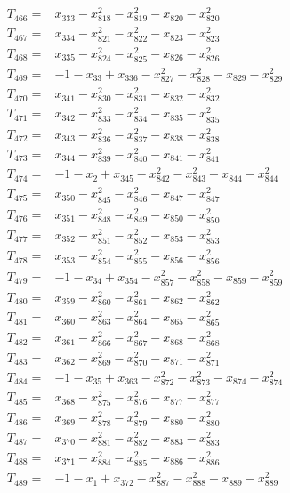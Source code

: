 \begin{align*}
T_{466}={}&x_{333}-x_{818}^{2}-x_{819}^{2}-x_{820}-x_{820}^{2}\\[3pt]
T_{467}={}&x_{334}-x_{821}^{2}-x_{822}^{2}-x_{823}-x_{823}^{2}\\[3pt]
T_{468}={}&x_{335}-x_{824}^{2}-x_{825}^{2}-x_{826}-x_{826}^{2}\\[3pt]
T_{469}={}&-1-x_{33}+x_{336}-x_{827}^{2}-x_{828}^{2}-x_{829}-x_{829}^{2}\\[3pt]
T_{470}={}&x_{341}-x_{830}^{2}-x_{831}^{2}-x_{832}-x_{832}^{2}\\[3pt]
T_{471}={}&x_{342}-x_{833}^{2}-x_{834}^{2}-x_{835}-x_{835}^{2}\\[3pt]
T_{472}={}&x_{343}-x_{836}^{2}-x_{837}^{2}-x_{838}-x_{838}^{2}\\[3pt]
T_{473}={}&x_{344}-x_{839}^{2}-x_{840}^{2}-x_{841}-x_{841}^{2}\\[3pt]
T_{474}={}&-1-x_{2}+x_{345}-x_{842}^{2}-x_{843}^{2}-x_{844}-x_{844}^{2}\\[3pt]
T_{475}={}&x_{350}-x_{845}^{2}-x_{846}^{2}-x_{847}-x_{847}^{2}\\[3pt]
T_{476}={}&x_{351}-x_{848}^{2}-x_{849}^{2}-x_{850}-x_{850}^{2}\\[3pt]
T_{477}={}&x_{352}-x_{851}^{2}-x_{852}^{2}-x_{853}-x_{853}^{2}\\[3pt]
T_{478}={}&x_{353}-x_{854}^{2}-x_{855}^{2}-x_{856}-x_{856}^{2}\\[3pt]
T_{479}={}&-1-x_{34}+x_{354}-x_{857}^{2}-x_{858}^{2}-x_{859}-x_{859}^{2}\\[3pt]
T_{480}={}&x_{359}-x_{860}^{2}-x_{861}^{2}-x_{862}-x_{862}^{2}\\[3pt]
T_{481}={}&x_{360}-x_{863}^{2}-x_{864}^{2}-x_{865}-x_{865}^{2}\\[3pt]
T_{482}={}&x_{361}-x_{866}^{2}-x_{867}^{2}-x_{868}-x_{868}^{2}\\[3pt]
T_{483}={}&x_{362}-x_{869}^{2}-x_{870}^{2}-x_{871}-x_{871}^{2}\\[3pt]
T_{484}={}&-1-x_{35}+x_{363}-x_{872}^{2}-x_{873}^{2}-x_{874}-x_{874}^{2}\\[3pt]
T_{485}={}&x_{368}-x_{875}^{2}-x_{876}^{2}-x_{877}-x_{877}^{2}\\[3pt]
T_{486}={}&x_{369}-x_{878}^{2}-x_{879}^{2}-x_{880}-x_{880}^{2}\\[3pt]
T_{487}={}&x_{370}-x_{881}^{2}-x_{882}^{2}-x_{883}-x_{883}^{2}\\[3pt]
T_{488}={}&x_{371}-x_{884}^{2}-x_{885}^{2}-x_{886}-x_{886}^{2}\\[3pt]
T_{489}={}&-1-x_{1}+x_{372}-x_{887}^{2}-x_{888}^{2}-x_{889}-x_{889}^{2}\\[3pt]

\end{align*}
